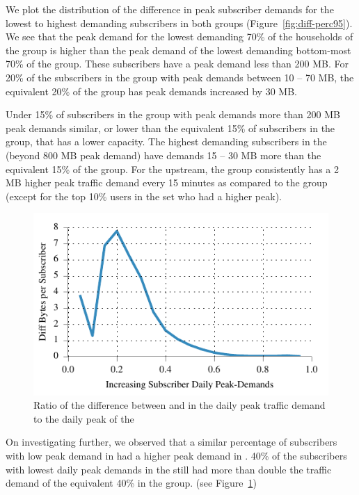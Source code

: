 We plot the distribution of the difference in peak subscriber demands for
the lowest to highest demanding subscribers in both groups (Figure~\ref{fig:diff-perc95}).
We see that the peak demand for the lowest demanding 70\% of the households of
the \treatment{} group is higher than the peak demand of the lowest demanding bottom-most
70\% of the \control{} group. These subscribers have a peak demand less than 200 MB.
For 20\% of the subscribers in the \control{} group with peak demands between 10 -- 70 MB,
the equivalent 20\% of the \treatment{} group has peak demands increased by 30 MB.

Under 15\% of subscribers in the \treatment{} group with peak demands more than 200 MB 
peak demands similar, or lower than the equivalent 15\% of subscribers in the \control{}
group, that has a lower capacity. The highest demanding subscribers in the \treatment{}
(beyond 800 MB peak demand) have demands 15 -- 30 MB more than the equivalent 15\% of 
the \control{} group. For the upstream, the \treatment{} group consistently has
a 2 MB higher peak traffic demand every 15 minutes as compared to the \control{} group
(except for the top 10\% users in the \treatment{} set who had a higher peak).

\begin{figure}[t]
\centering
\includegraphics[width=\linewidth]{figures/diff_perc95_bytes_subsc-daily-normalized.pdf}
               \caption{Ratio of the difference between \treatment{} and \control{}
               in the daily peak traffic demand to the daily peak of the \control\label{fig:daily-ratio-perc95}}
\end{figure}

On investigating further, we observed that a similar percentage of 
subscribers with low peak demand in \control{} had a higher peak demand in \treatment{}.
40\% of the subscribers with lowest daily peak demands in the \treatment{} still
had more than double the traffic demand of the equivalent 40\% in the \control{} group.
(see Figure~\ref{fig:daily-ratio-perc95})

